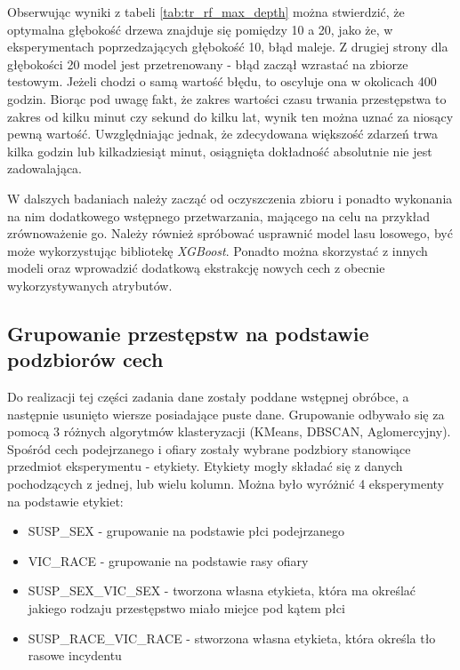 \documentclass{classrep}
\begin{document}
{{{                Obserwując wyniki z tabeli \ref{tab:tr_rf_max_depth} można stwierdzić, że optymalna głębokość drzewa znajduje się pomiędzy 10 a 20, jako że, w eksperymentach poprzedzających głębokość 10, błąd maleje. Z drugiej strony dla głębokości 20 model jest przetrenowany - błąd zaczął wzrastać na zbiorze testowym. Jeżeli chodzi o samą wartość błędu, to oscyluje ona w okolicach 400 godzin. Biorąc pod uwagę fakt, że zakres wartości czasu trwania przestępstwa to zakres od kilku minut czy sekund do kilku lat, wynik ten można uznać za niosący pewną wartość. Uwzględniając jednak, że zdecydowana większość zdarzeń trwa kilka godzin lub kilkadziesiąt minut, osiągnięta dokładność absolutnie nie jest zadowalająca.
                
                W dalszych badaniach należy zacząć od oczyszczenia zbioru i ponadto wykonania na nim dodatkowego wstępnego przetwarzania, mającego na celu na przykład zrównoważenie go. Należy również spróbować usprawnić model lasu losowego, być może wykorzystując bibliotekę \emph{XGBoost}. Ponadto można skorzystać z innych modeli oraz wprowadzić dodatkową ekstrakcję nowych cech z obecnie wykorzystywanych atrybutów.
            }
            
        }

        \subsection{Grupowanie przestępstw na podstawie podzbiorów cech} {
            Do realizacji tej części zadania dane zostały poddane wstępnej obróbce, a następnie usunięto wiersze posiadające puste dane. Grupowanie odbywało się za pomocą 3 różnych algorytmów klasteryzacji (KMeans, DBSCAN, Aglomercyjny).
            Spośród cech podejrzanego i ofiary zostały wybrane podzbiory stanowiące przedmiot eksperymentu - etykiety. Etykiety mogły składać się z danych pochodzących z jednej, lub wielu kolumn. Można było wyróżnić 4 eksperymenty na podstawie etykiet:
            \begin{itemize}
                \item SUSP\_SEX - grupowanie na podstawie płci podejrzanego
                \item VIC\_RACE - grupowanie na podstawie rasy ofiary
                \item SUSP\_SEX\_VIC\_SEX - tworzona własna etykieta, która ma określać jakiego rodzaju przestępstwo miało miejce pod kątem płci
                \item SUSP\_RACE\_VIC\_RACE - stworzona własna etykieta, która określa tło rasowe incydentu
            \end{itemize}
}}
\end{document}
